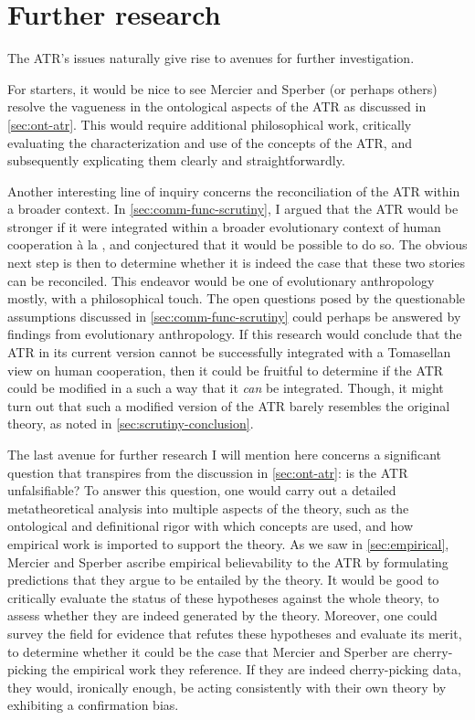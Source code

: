 \section*{Further research}

The ATR's issues naturally give rise to avenues for further investigation.

For starters, it would be nice to see Mercier and Sperber (or perhaps others) resolve the vagueness in the ontological aspects of the ATR as discussed in \cref{sec:ont-atr}. This would require additional philosophical work, critically evaluating the characterization and use of the concepts of the ATR, and subsequently explicating them clearly and straightforwardly.

Another interesting line of inquiry concerns the reconciliation of the ATR within a broader context. In \cref{sec:comm-func-scrutiny}, I argued that the ATR would be stronger if it were integrated within a broader evolutionary context of human cooperation à la \citet{Tomasello09}, and conjectured that it would be possible to do so. The obvious next step is then to determine whether it is indeed the case that these two stories can be reconciled. This endeavor would be one of evolutionary anthropology mostly, with a philosophical touch. The open questions posed by the questionable assumptions discussed in \cref{sec:comm-func-scrutiny} could perhaps be answered by findings from evolutionary anthropology.
If this research would conclude that the ATR in its current version cannot be successfully integrated with a Tomasellan view on human cooperation, then it could be fruitful to determine if the ATR could be modified in a such a way that it \emph{can} be integrated. Though, it might turn out that such a modified version of the ATR barely resembles the original theory, as noted in \cref{sec:scrutiny-conclusion}.

The last avenue for further research I will mention here concerns a significant question that transpires from the discussion in \cref{sec:ont-atr}: is the ATR unfalsifiable?
To answer this question, one would carry out a detailed metatheoretical analysis into multiple aspects of the theory, such as the ontological and definitional rigor with which concepts are used, and how empirical work is imported to support the theory. As we saw in \cref{sec:empirical}, Mercier and Sperber ascribe empirical believability to the ATR by formulating predictions that they argue to be entailed by the theory. It would be good to critically evaluate the status of these hypotheses against the whole theory, to assess whether they are indeed generated by the theory. Moreover, one could survey the field for evidence that refutes these hypotheses and evaluate its merit, to determine whether it could be the case that Mercier and Sperber are cherry-picking the empirical work they reference. If they are indeed cherry-picking data, they would, ironically enough, be acting consistently with their own theory by exhibiting a confirmation bias.

